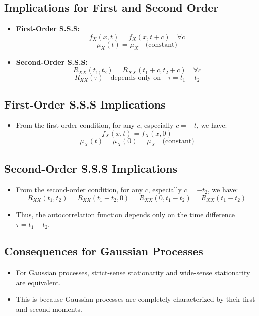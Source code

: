 \documentclass[12pt]{article}
\begin{document}
\subsection{Implications for First and Second Order}
\begin{itemize}
    \item \textbf{First-Order S.S.S:}
    \[
    f_X(x,t) = f_X(x,t + c) \quad \forall c
    \]
    \[
    \mu_X(t) = \mu_X \quad \text{(constant)}
    \]
    \item \textbf{Second-Order S.S.S:}
    \[
    R_{XX}(t_1, t_2) = R_{XX}(t_1 + c, t_2 + c) \quad \forall c
    \]
    \[
    R_{XX}(\tau) \quad \text{depends only on} \quad \tau = t_1 - t_2
    \]
\end{itemize}

\subsection{First-Order S.S.S Implications}
\begin{itemize}
    \item From the first-order condition, for any \( c \), especially \( c = -t \), we have:
    \[
    f_X(x,t) = f_X(x,0)
    \]
    \[
    \mu_X(t) = \mu_X(0) = \mu_X \quad \text{(constant)}
    \]
\end{itemize}

\subsection{Second-Order S.S.S Implications}
\begin{itemize}
    \item From the second-order condition, for any \( c \), especially \( c = -t_2 \), we have:
    \[
    R_{XX}(t_1, t_2) = R_{XX}(t_1 - t_2, 0) = R_{XX}(0, t_1 - t_2) = R_{XX}(t_1 - t_2)
    \]
    \item Thus, the autocorrelation function depends only on the time difference \( \tau = t_1 - t_2 \).
\end{itemize}

\subsection{Consequences for Gaussian Processes}
\begin{itemize}
    \item For Gaussian processes, strict-sense stationarity and wide-sense stationarity are equivalent.
    \item This is because Gaussian processes are completely characterized by their first and second moments.
\end{itemize}
\end{document}
